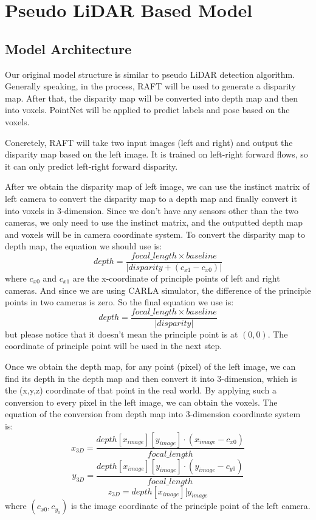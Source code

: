 \documentclass[12pt]{article}
\begin{document}
\section{Pseudo LiDAR Based Model}
\subsection{Model Architecture}
Our original model structure is similar to pseudo LiDAR detection algorithm. Generally speaking, in the process, RAFT will be used to generate a disparity map. After that, the disparity map will be converted into depth map and then into voxels. PointNet will be applied to predict labels and pose based on the voxels.

Concretely, RAFT will take two input images (left and right) and output the disparity map based on the left image. It is trained on left-right forward flows, so it can only predict left-right forward disparity.

After we obtain the disparity map of left image, we can use the instinct matrix of left camera to convert the disparity map to a depth map and finally convert it into voxels in 3-dimension. Since we don't have any sensors other than the two cameras, we only need to use the instinct matrix, and the outputted depth map and voxels will be in camera coordinate system. To convert the disparity map to depth map, the equation we should use is:$$depth=\frac{focal\_length\times baseline}{|disparity+(c_{x1}-c_{x0})|}$$where $c_{x0}$ and $c_{x1}$ are the x-coordinate of principle points of left and right cameras. And since we are using CARLA simulator, the difference of the principle points in two cameras is zero. So the final equation we use is:$$depth=\frac{focal\_length\times baseline}{|disparity|}$$but please notice that it doesn't mean the principle point is at $(0,0)$. The coordinate of principle point will be used in the next step.

Once we obtain the depth map, for any point (pixel) of the left image, we can find its depth in the depth map and then convert it into 3-dimension, which is the (x,y,z) coordinate of that point in the real world. By applying such a conversion to every pixel in the left image, we can obtain the voxels. The equation of the conversion from depth map into 3-dimension coordinate system is:$$x_{3D}=\frac{depth[x_{image}][y_{image}]\cdot(x_{image}-c_{x0})}{focal\_length}$$
$$y_{3D}=\frac{depth[x_{image}][y_{image}]\cdot(y_{image}-c_{y0})}{focal\_length}$$
$$z_{3D}=depth[x_{image}][y_{image}$$
where $(c_{x0},c_{y_0})$ is the image coordinate of the principle point of the left camera.
\end{document}
